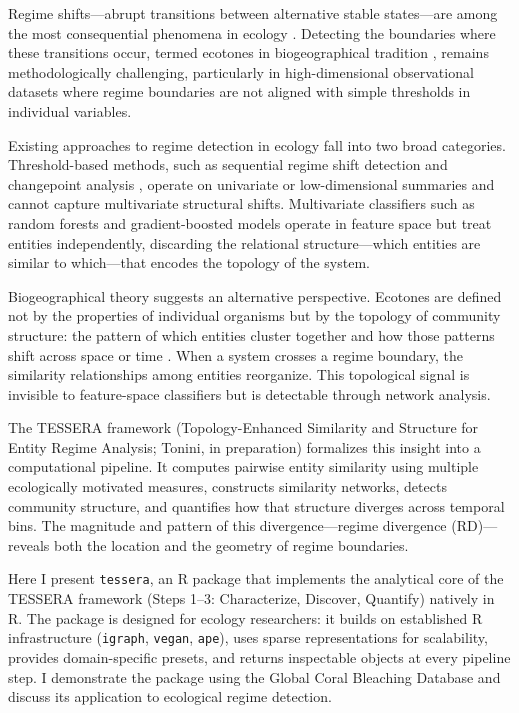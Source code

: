 \documentclass[12pt]{article}
\begin{document}
Regime shifts---abrupt transitions between alternative stable states---are among the most consequential phenomena in ecology \citep{Scheffer2001, Folke2004}. Detecting the boundaries where these transitions occur, termed ecotones in biogeographical tradition \citep{Clements1905}, remains methodologically challenging, particularly in high-dimensional observational datasets where regime boundaries are not aligned with simple thresholds in individual variables.

Existing approaches to regime detection in ecology fall into two broad categories. Threshold-based methods, such as sequential regime shift detection \citep{Rodionov2004} and changepoint analysis \citep{Killick2014}, operate on univariate or low-dimensional summaries and cannot capture multivariate structural shifts. Multivariate classifiers such as random forests and gradient-boosted models operate in feature space but treat entities independently, discarding the relational structure---which entities are similar to which---that encodes the topology of the system.

Biogeographical theory suggests an alternative perspective. Ecotones are defined not by the properties of individual organisms but by the topology of community structure: the pattern of which entities cluster together and how those patterns shift across space or time \citep{Uyeda2014}. When a system crosses a regime boundary, the similarity relationships among entities reorganize. This topological signal is invisible to feature-space classifiers but is detectable through network analysis.

The TESSERA framework (Topology-Enhanced Similarity and Structure for Entity Regime Analysis; Tonini, in preparation) formalizes this insight into a computational pipeline. It computes pairwise entity similarity using multiple ecologically motivated measures, constructs similarity networks, detects community structure, and quantifies how that structure diverges across temporal bins. The magnitude and pattern of this divergence---regime divergence (RD)---reveals both the location and the geometry of regime boundaries.

Here I present \texttt{tessera}, an R package that implements the analytical core of the TESSERA framework (Steps 1--3: Characterize, Discover, Quantify) natively in R. The package is designed for ecology researchers: it builds on established R infrastructure (\texttt{igraph}, \texttt{vegan}, \texttt{ape}), uses sparse representations for scalability, provides domain-specific presets, and returns inspectable objects at every pipeline step. I demonstrate the package using the Global Coral Bleaching Database \citep{vanWoesik2022} and discuss its application to ecological regime detection.
\end{document}
